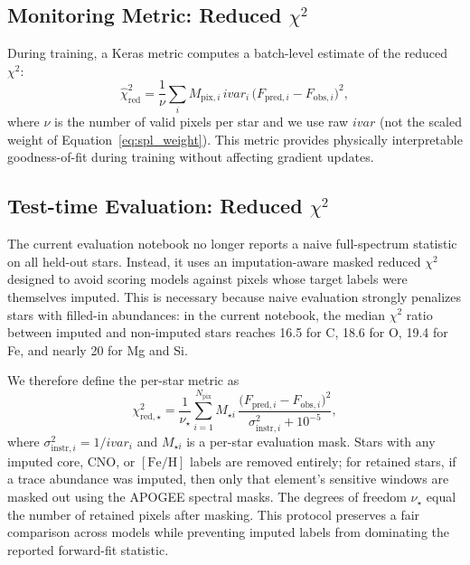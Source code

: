 \documentclass[preprint]{aastex701-1/aastex701}
\begin{document}
\subsection{Monitoring Metric: Reduced $\chi^2$}
\label{subsec:chi2_metric}

During training, a Keras metric computes a batch-level estimate of the reduced
$\chi^2$:
\begin{equation}
\hat{\chi}^2_\mathrm{red} = \frac{1}{\nu} \sum_{i}
  M_{\mathrm{pix},i}\,\mathit{ivar}_i \, \bigl(F_{\mathrm{pred},i} - F_{\mathrm{obs},i}\bigr)^2,
\label{eq:chi2_batch}
\end{equation}
where $\nu$ is the number of valid pixels per star and we use raw
$\mathit{ivar}$ (not the scaled weight of Equation~\ref{eq:spl_weight}). This metric
provides physically interpretable goodness-of-fit during training without affecting
gradient updates.

\subsection{Test-time Evaluation: Reduced $\chi^2$}
\label{subsec:chi2_full}

The current evaluation notebook no longer reports a naive full-spectrum statistic on all
held-out stars. Instead, it uses an imputation-aware masked reduced $\chi^2$ designed to
avoid scoring models against pixels whose target labels were themselves imputed. This is
necessary because naive evaluation strongly penalizes stars with filled-in abundances:
in the current notebook, the median $\chi^2$ ratio between imputed and non-imputed stars
reaches 16.5 for C, 18.6 for O, 19.4 for Fe, and nearly 20 for Mg and Si.

We therefore define the per-star metric as
\begin{equation}
\chi^2_{\mathrm{red},\star} = \frac{1}{\nu_\star} \sum_{i=1}^{N_\mathrm{pix}}
  M_{\star i}\,
  \frac{\bigl(F_{\mathrm{pred},i} - F_{\mathrm{obs},i}\bigr)^2}
       {\sigma^2_{\mathrm{instr},i}  + 10^{-5}},
\label{eq:chi2_full}
\end{equation}
where $\sigma^2_{\mathrm{instr},i}=1/\mathit{ivar}_i$ and $M_{\star i}$ is a per-star
evaluation mask. Stars with any imputed core, CNO, or $[\mathrm{Fe/H}]$ labels are removed
entirely; for retained stars, if a trace abundance was imputed, then only that element's
sensitive windows are masked out using the APOGEE spectral masks. The degrees of freedom
$\nu_\star$ equal the number of retained pixels after masking. This protocol preserves a
fair comparison across models while preventing imputed labels from dominating the reported
forward-fit statistic.
\end{document}
